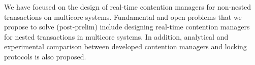 \documentclass[12pt,english]{report}
\begin{document}
We have focused on the design of real-time contention managers for non-nested transactions on multicore systems. Fundamental and open problems that we propose to solve (post-prelim) include designing real-time contention managers for nested transactions in multicore systems. In addition, analytical and experimental comparison between developed contention managers and locking protocols is also proposed.


\vfill







%


\pagestyle{myheadings}


\end{document}
